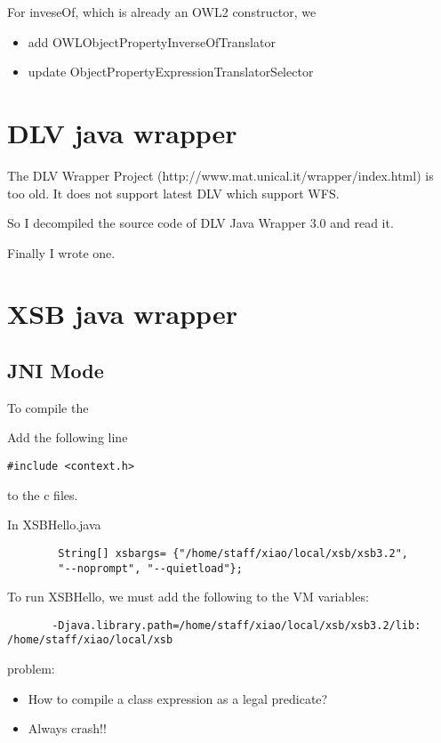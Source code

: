 \documentclass{article}
\begin{document}
For inveseOf, which is already an OWL2 constructor, we
\begin{itemize}
\item add OWLObjectPropertyInverseOfTranslator
\item update ObjectPropertyExpressionTranslatorSelector
\end{itemize}

\section{DLV java wrapper}

The DLV Wrapper Project (http://www.mat.unical.it/wrapper/index.html) is
too old. It does not support latest DLV which support WFS.

So I decompiled the source code of DLV Java Wrapper 3.0 and read it.

Finally I wrote one.

\section{XSB java wrapper}

\subsection{JNI Mode}
\label{sec:XSB-jni}

To compile the 

Add the following line
\begin{verbatim}
#include <context.h>
\end{verbatim}
to the c files.
	
In XSBHello.java
\begin{verbatim}
    	String[] xsbargs= {"/home/staff/xiao/local/xsb/xsb3.2", 
    	"--noprompt", "--quietload"};
\end{verbatim}
	
To run XSBHello, we must add the following to the VM variables:
\begin{verbatim}
       -Djava.library.path=/home/staff/xiao/local/xsb/xsb3.2/lib:
/home/staff/xiao/local/xsb
\end{verbatim}
	
problem: 
\begin{itemize}
\item How to compile a class expression as a legal predicate?
\item Always crash!!
\end{itemize}
\end{document}
